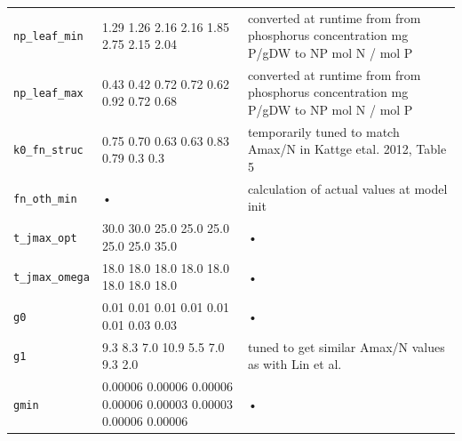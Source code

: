 \begin{table}
\begin{tabularx}{\linewidth}{|l|l|X|}
\texttt{np\_leaf\_min} & 1.29 1.26 2.16 2.16 1.85 2.75 2.15 2.04 & converted at runtime from from phosphorus concentration mg P/gDW to NP mol N / mol P \\
\texttt{np\_leaf\_max} & 0.43 0.42 0.72 0.72 0.62 0.92 0.72 0.68 & converted at runtime from from phosphorus concentration mg P/gDW to NP mol N / mol P \\
\texttt{k0\_fn\_struc} & 0.75 0.70 0.63 0.63 0.83 0.79 0.3 0.3 & temporarily tuned to match Amax/N in Kattge etal. 2012, Table 5 \\
\texttt{fn\_oth\_min} & • & calculation of actual values at model init \\
\texttt{t\_jmax\_opt} & 30.0 30.0 25.0 25.0 25.0 25.0 25.0 35.0 & • \\
\texttt{t\_jmax\_omega} & 18.0 18.0 18.0 18.0 18.0 18.0 18.0 18.0 & • \\
\texttt{g0} & 0.01 0.01 0.01 0.01 0.01 0.01 0.03 0.03 & • \\
\texttt{g1} & 9.3 8.3 7.0 10.9 5.5 7.0 9.3 2.0 & tuned to get similar Amax/N values as with Lin et al. \\
\texttt{gmin} & 0.00006 0.00006 0.00006 0.00006 0.00003 0.00003 0.00006 0.00006 & • \\

\hline 
\end{tabularx}
\end{table}


